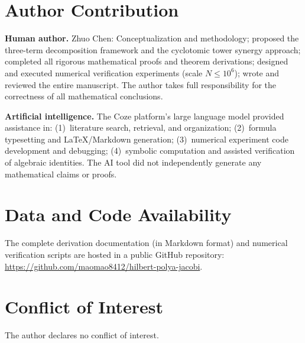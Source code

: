 \documentclass[11pt,a4paper]{article}
\theoremstyle{remark}
\begin{document}
\section*{Author Contribution}

\noindent\textbf{Human author.} Zhuo Chen: Conceptualization and methodology; proposed the three-term decomposition framework and the cyclotomic tower synergy approach; completed all rigorous mathematical proofs and theorem derivations; designed and executed numerical verification experiments (scale $N \leq 10^6$); wrote and reviewed the entire manuscript. The author takes full responsibility for the correctness of all mathematical conclusions.

\medskip
\noindent\textbf{Artificial intelligence.} The Coze platform's large language model provided assistance in: (1)~literature search, retrieval, and organization; (2)~formula typesetting and \LaTeX/\mbox{Markdown} generation; (3)~numerical experiment code development and debugging; (4)~symbolic computation and assisted verification of algebraic identities. The AI tool did not independently generate any mathematical claims or proofs.

\section*{Data and Code Availability}

The complete derivation documentation (in Markdown format) and numerical verification scripts are hosted in a public GitHub repository: \url{https://github.com/maomao8412/hilbert-polya-jacobi}.

\section*{Conflict of Interest}

The author declares no conflict of interest.

\end{document}
